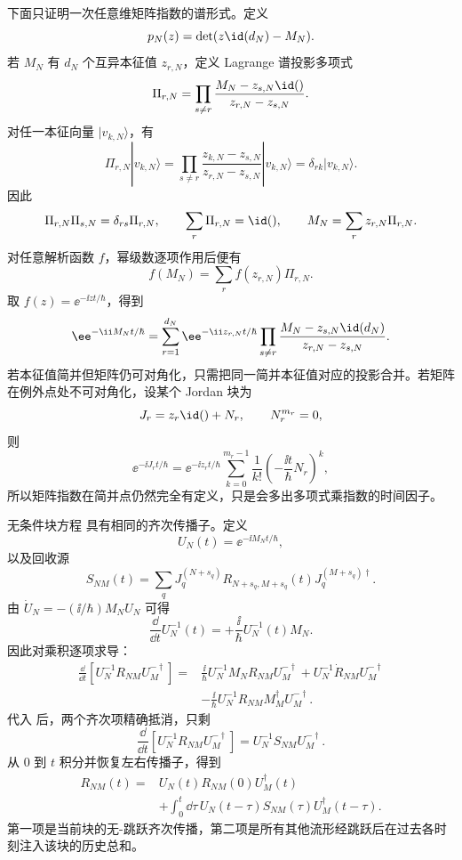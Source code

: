 下面只证明一次任意维矩阵指数的谱形式。定义
\[
p_N(z)=\det(z\id(d_N)-M_N).
\]
若 $M_N$ 有 $d_N$ 个互异本征值 $z_{r,N}$，定义 Lagrange 谱投影多项式
\begin{equation}
\Pi_{r,N}
=\prod_{s\ne r}
\frac{M_N-z_{s,N}\id()}{z_{r,N}-z_{s,N}}.
\label{eq:phys-oqs-lagrange-projector}
\end{equation}
对任一本征向量 $|v_{k,N}\rangle$，有
\[
\Pi_{r,N}|v_{k,N}\rangle
=\prod_{s\ne r}
\frac{z_{k,N}-z_{s,N}}{z_{r,N}-z_{s,N}}
|v_{k,N}\rangle
=\delta_{rk}|v_{k,N}\rangle.
\]
因此
\[
\Pi_{r,N}\Pi_{s,N}=\delta_{rs}\Pi_{r,N},
\qquad
\sum_r\Pi_{r,N}=\id(),
\qquad
M_N=\sum_r z_{r,N}\Pi_{r,N}.
\]
对任意解析函数 $f$，幂级数逐项作用后便有
\[
f(M_N)=\sum_r f(z_{r,N})\Pi_{r,N}.
\]
取 $f(z)=\ee^{-\ii zt/\hbar}$，得到
\begin{equation}
\ee^{-\ii M_Nt/\hbar}
=\sum_{r=1}^{d_N}
\ee^{-\ii z_{r,N}t/\hbar}
\prod_{s\ne r}
\frac{M_N-z_{s,N}\id(d_N)}{z_{r,N}-z_{s,N}}.
\label{eq:phys-oqs-spectral-propagator}
\end{equation}
若本征值简并但矩阵仍可对角化，只需把同一简并本征值对应的投影合并。若矩阵在例外点处不可对角化，设某个 Jordan 块为
\[
J_r=z_r\id()+N_r,
\qquad N_r^{m_r}=0,
\]
则
\begin{equation}
\ee^{-\ii J_rt/\hbar}
=\ee^{-\ii z_rt/\hbar}
\sum_{k=0}^{m_r-1}\frac1{k!}
\left(-\frac{\ii t}{\hbar}N_r\right)^k,
\label{eq:phys-oqs-jordan-propagator}
\end{equation}
所以矩阵指数在简并点仍然完全有定义，只是会多出多项式乘指数的时间因子。

无条件块方程 具有相同的齐次传播子。定义
\[
U_N(t)=\ee^{-\ii M_Nt/\hbar},
\]
以及回收源
\begin{equation}
S_{NM}(t)=\sum_q
J_q^{(N+s_q)}R_{N+s_q,M+s_q}(t)
J_q^{(M+s_q)\dagger}.
\label{eq:phys-oqs-block-source}
\end{equation}
由 $\dot U_N=-(\ii/\hbar)M_NU_N$ 可得
\[
\frac{\dd}{\dd t}U_N^{-1}(t)
=+\frac{\ii}{\hbar}U_N^{-1}(t)M_N.
\]
因此对乘积逐项求导：
\begin{align}
\frac{\dd}{\dd t}
[U_N^{-1}R_{NM}U_M^{-\dagger}]
={}&\frac{\ii}{\hbar}U_N^{-1}M_NR_{NM}U_M^{-\dagger}
+U_N^{-1}\dot R_{NM}U_M^{-\dagger}\nonumber\\
&-\frac{\ii}{\hbar}U_N^{-1}R_{NM}M_M^\dagger U_M^{-\dagger}.
\end{align}
代入 后，两个齐次项精确抵消，只剩
\[
\frac{\dd}{\dd t}
[U_N^{-1}R_{NM}U_M^{-\dagger}]
=U_N^{-1}S_{NM}U_M^{-\dagger}.
\]
从 $0$ 到 $t$ 积分并恢复左右传播子，得到
\begin{equation}
\begin{aligned}
R_{NM}(t)
={}&U_N(t)R_{NM}(0)U_M^\dagger(t)\\
&+\int_0^t\dd\tau\,
U_N(t-\tau)S_{NM}(\tau)U_M^\dagger(t-\tau).
\end{aligned}
\label{eq:phys-oqs-duhamel-block}
\end{equation}
第一项是当前块的无-跳跃齐次传播，第二项是所有其他流形经跳跃后在过去各时刻注入该块的历史总和。

